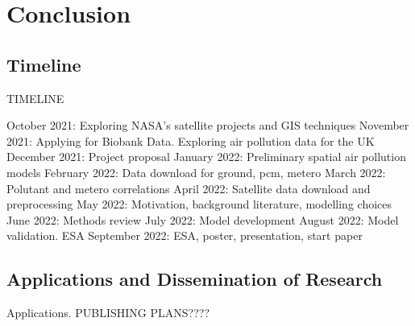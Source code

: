 \chapter{Conclusion}\label{ch:conclusions}

\section{Timeline}

TIMELINE


October 2021: Exploring NASA's satellite projects and GIS techniques
November 2021: Applying for Biobank Data. Exploring air pollution data for the UK
December 2021: Project proposal
January 2022: Preliminary spatial air pollution models
February 2022: Data download for ground, pcm, metero
March 2022: Polutant and metero correlations
April 2022: Satellite data download and preprocessing
May 2022: Motivation, background literature, modelling choices
June 2022: Methods review
July 2022: Model development
August 2022: Model validation. ESA
September 2022: ESA, poster, presentation, start paper



\section{Applications and Dissemination of Research}

Applications.
PUBLISHING PLANS????
